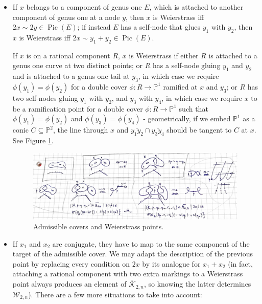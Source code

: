 \documentclass{compositio}
\newcommand{\PP}{\mathbb P}
\renewcommand{\to}{\rightarrow}
\newcommand{\Pic}{\operatorname{Pic}}
\theoremstyle{plain}
\theoremstyle{definition}
\theoremstyle{remark}
\begin{document}
 \begin{itemize}[leftmargin=.5cm]
  \item If $x$ belongs to a component of genus one $E$, which is attached to another component of genus one at a node $y$, then $x$ is Weierstrass iff $2x\sim 2y\in\Pic(E)$; if instead $E$ has a self-node that glues $y_1$ with $y_2$, then $x$ is Weierstrass iff $2x\sim y_1+y_2\in\Pic(E)$.
  
  If $x$ is on a rational component $R$, $x$ is Weierstrass if either $R$ is attached to a genus one curve at two distinct points; or $R$ has a self-node gluing $y_1$ and $y_2$ and is attached to a genus one tail at $y_3$, in which case we require $\phi(y_1)=\phi(y_2)$ for a double cover $\phi\colon R\to\PP^1$ ramified at $x$ and $y_3$; or $R$ has two self-nodes gluing $y_1$ with $y_2$, and $y_3$ with $y_4$, in which case we require $x$ to be a ramification point for a double cover $\phi\colon R\to\PP^1$ such that $\phi(y_1)=\phi(y_2)$ and $\phi(y_3)=\phi(y_4)$ - geometrically, if we embed $\PP^1$ as a conic $C\subseteq\PP^2$, the line through $x$ and $\overline{y_1y_2}\cap\overline{y_3y_4}$ should be tangent to $C$ at $x$. See Figure \ref{fig:adm_W}.
  \begin{center}
  \begin{figure}[!ht]
  \includegraphics[width=\textwidth]{admissible_Weierstrass}
  \caption{Admissible covers and Weierstrass points.}\label{fig:adm_W}
  \end{figure}
  \end{center}
 \item If $x_1$ and $x_2$ are conjugate, they have to map to the same component of the target of the admissible cover. We may adapt the description of the previous point by replacing every condition on $2x$ by its analogue for $x_1+x_2$ (in fact, attaching a rational component with two extra markings to a Weierstrass point always produces an element of $\overline{\mathcal K}_{2,n}$, so knowing the latter determines $\overline{\mathcal W}_{2,n}$).  There are a few more situations to take into account: %

\end{itemize}
\end{document}
